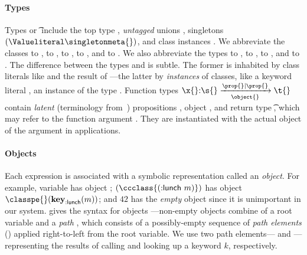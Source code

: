 \paragraph{Types} Types \s{} or \t{} 
include the top type \Top,
\emph{untagged} unions {\Unionsplice {\overrightarrow{\t{}}}}, 
singletons ${\Value \singletonmeta{}}$,
and class instances \class{}.
We abbreviate the classes
\Booleanlong{} to \Boolean{}, 
\Keywordlong{} to \Keyword{},
\NumberFull{}  to \Number{},
\StringFull{}  to \String{}, and 
\FileFull{}  to \File{}.
We also abbreviate the types
\EmptyUnion{}     to \Bot{}, 
{\ValueNil}       to \Nil{}, 
{\ValueTrue}      to \True, and
{\ValueFalse} to {\False}.
%
The difference between the types
\Value{\class{}} and \class{} is subtle.
The former is inhabited by class literals like \Keyword{} and the result of 
---the latter by \emph{instances} of classes,
like a keyword literal , an instance of the type \Keyword{}.
%
Function types 
$
{\ArrowOne {\x{}} {\s{}}
             {\t{}}
             {\filterset {\prop{}} {\prop{}}}
             {\object{}}}
$
contain \emph{latent} (terminology from~\cite{Lucassen88polymorphiceffect}) propositions \prop{}, object \object{}, and return type
\t{},
which may refer to the function argument \x{}.
They are instantiated with the
actual object of the argument in applications. %

\paragraph{Objects}
Each expression is associated with 
a symbolic representation
called an \emph{object}.
For example,
  variable  has object ;
  $\appexpone{\ccclass{\appexp{\makekw{lunch}}{\makelocal{m}}}}$ has object ${\pth{\classpe{}}{\pth{\keype{\makekw{lunch}}}{\makelocal{m}}}}$; and $42$ has the \emph{empty} object \emptyobject{} since it is unimportant in our system.
%
 gives the syntax for objects \object{}---non-empty objects 
\pth{\pathelem{}}{\x{}} combine of a root variable \x{} and a \emph{path} \pathelem{},
which consists of
a possibly-empty sequence of \emph{path elements} (\pesyntax{}) applied right-to-left from the root variable.
We use two path elements---{\classpe{}} and {}---representing the results
of calling \classconst{} and looking up a keyword $k$, respectively.

